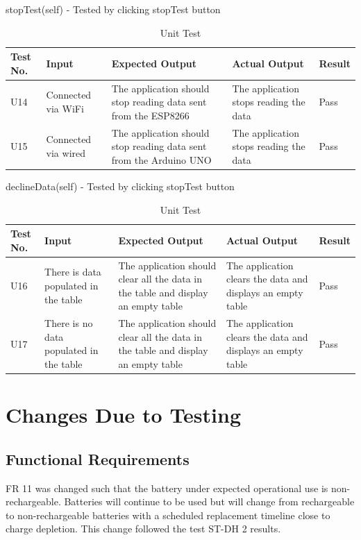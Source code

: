 \documentclass[12pt, titlepage]{article}
\begin{document}
  stopTest(self) - Tested by clicking stopTest button
  \begin{table}[H]
    \begin{tabular}{| p{} | p{}| p{}| p{}| p{}|}
      \hline
      \rowcolor[gray]{0.9}
      Test No. & Input & Expected Output & Actual Output & Result\\
      \hline
      U14 & Connected via WiFi & The application should stop reading data sent from the ESP8266  & The application stops reading the data & Pass \\
      \hline
      U15 & Connected via wired & The application should stop reading data sent from the Arduino UNO & The application stops reading the data & Pass \\
      \hline
    \end{tabular}
    \caption{Unit Test}
    \end{table}

  declineData(self) - Tested by clicking stopTest button
  \begin{table}[H]
    \begin{tabular}{| p{} | p{}| p{}| p{}| p{}|}
      \hline
      \rowcolor[gray]{0.9}
      Test No. & Input & Expected Output & Actual Output & Result\\
      \hline
      U16 & There is data populated in the table & The application should clear all the data in the table and display an empty table  & The application clears the data and displays an empty table & Pass \\
      \hline
      U17 & There is no data populated in the table & The application should clear all the data in the table and display an empty table  & The application clears the data and displays an empty table & Pass \\
      \hline
    \end{tabular}
    \caption{Unit Test}
    \end{table}
\section{Changes Due to Testing}

\subsection{Functional Requirements}
FR 11 was changed such that the battery under expected operational use is non-rechargeable. Batteries will continue to be used but will change from rechargeable to non-rechargeable batteries with a scheduled replacement timeline close to charge depletion. This change followed the test ST-DH 2 results. \\
\end{document}
